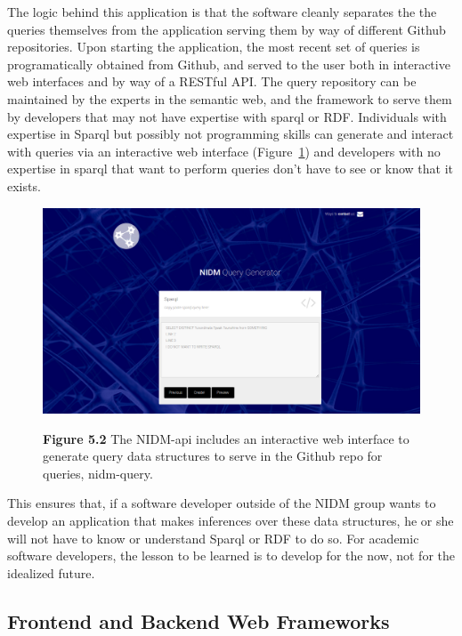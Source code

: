 \documentclass{report}
\begin{document}
The logic behind this application is that the software cleanly separates
the the queries themselves from the application serving them by way of
different Github repositories. Upon starting the application, the most
recent set of queries is programatically obtained from Github, and
served to the user both in interactive web interfaces and by way of a
RESTful API. The query repository can be maintained by the experts in
the semantic web, and the framework to serve them by developers that may
not have expertise with sparql or RDF. Individuals with expertise in
Sparql but possibly not programming skills can generate and interact
with queries via an interactive web interface (Figure~\ref{fig:52}) and
developers with no expertise in sparql that want to perform queries
don't have to see or know that it exists. ~

\begin{figure}[ht!]
\begin{center}
\includegraphics[width=15cm]{images/figure52.png}
\end{center}
 \textbf{\label{fig:52} Figure 5.2 }{ The NIDM-api includes an interactive web interface to
generate query data structures to serve in the Github repo for queries,
nidm-query.}
\end{figure}

This ensures that, if a software developer outside of the NIDM group
wants to develop an application that makes inferences over these data
structures, he or she will not have to know or understand Sparql or RDF
to do so. For academic software developers, the lesson to be learned is
to develop for the now, not for the idealized future.

\subsection{Frontend and Backend Web Frameworks}
\end{document}

